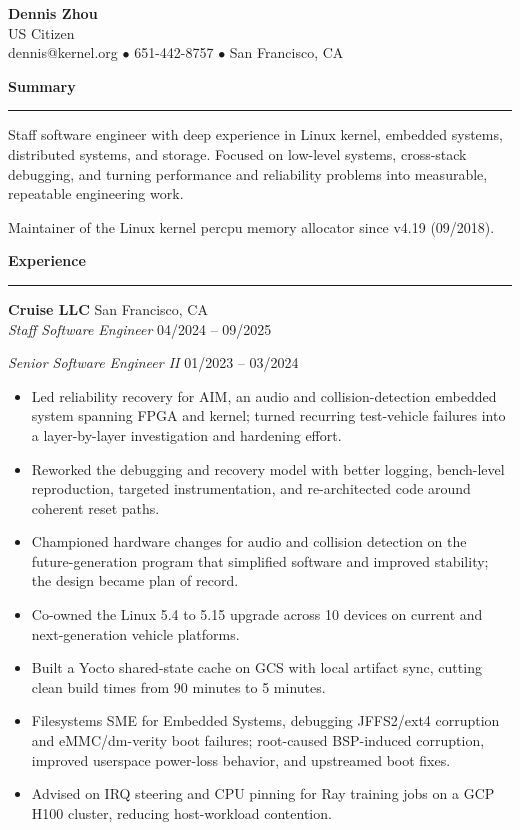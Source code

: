 \documentclass[10pt]{article}
\newcommand{\resumeSection}[1]{
  \vspace{0.45em}
  {\large\bfseries #1}\par
  \vspace{0.12em}
  \hrule
  \vspace{0.28em}
}
\newcommand{\resumeRole}[4]{
  \textbf{#1} \hfill #4 \\
  \textit{#3} \hfill #2\par
  \vspace{0.02em}
}
\begin{document}
\begin{center}
{\LARGE\bfseries Dennis Zhou} \\
\vspace{0.2em}
US Citizen \\
\vspace{0.1em}
dennis@kernel.org $\bullet$ 651-442-8757 $\bullet$ San Francisco, CA
\end{center}

\resumeSection{Summary}
Staff software engineer with deep experience in Linux kernel, embedded systems,
distributed systems, and storage.
Focused on low-level systems, cross-stack debugging, and turning performance
and reliability problems into measurable, repeatable engineering work.

\vspace{0.28em}

Maintainer of the Linux kernel percpu memory allocator since v4.19 (09/2018).

\resumeSection{Experience}
\resumeRole{Cruise LLC}{04/2024 -- 09/2025}{Staff Software Engineer}{San Francisco, CA}
\textit{Senior Software Engineer II} \hfill 01/2023 -- 03/2024\par
\vspace{0.02em}
\begin{itemize}
\item Led reliability recovery for AIM, an audio and collision-detection
embedded system spanning FPGA and kernel; turned recurring test-vehicle
failures into a layer-by-layer investigation and hardening effort.
\item Reworked the debugging and recovery model with better logging,
bench-level reproduction, targeted instrumentation, and re-architected code
around coherent reset paths.
\item Championed hardware changes for audio and collision detection on the
future-generation program that simplified software and improved stability; the
design became plan of record.
\item Co-owned the Linux 5.4 to 5.15 upgrade across 10 devices on current and
next-generation vehicle platforms.
\item Built a Yocto shared-state cache on GCS with local artifact sync, cutting
clean build times from 90 minutes to 5 minutes.
\item Filesystems SME for Embedded Systems, debugging JFFS2/ext4 corruption and
eMMC/dm-verity boot failures; root-caused BSP-induced corruption, improved
userspace power-loss behavior, and upstreamed boot fixes.
\item Advised on IRQ steering and CPU pinning for Ray training jobs on a GCP H100
cluster, reducing host-workload contention.
\end{itemize}
\end{document}
